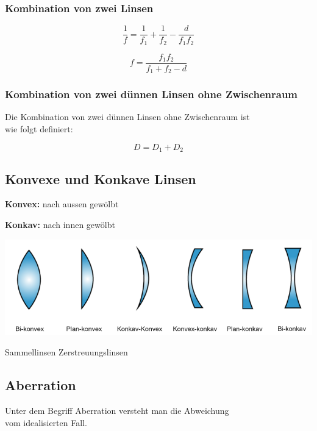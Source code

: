 \subsubsection{Kombination von zwei Linsen}

\begin{minipage}{0.48\linewidth}
	$$ \boxed{\frac{1}{f} = \frac{1}{f_1} + \frac{1}{f_2} - \frac{d}{f_1f_2}} $$
\end{minipage}
\hfill
\begin{minipage}{0.48\linewidth}
	$$ \boxed{f = \frac{f_1f_2}{f_1 + f_2 - d}} $$
\end{minipage}

\subsubsection{Kombination von zwei dünnen Linsen ohne Zwischenraum}

Die Kombination von zwei dünnen Linsen ohne Zwischenraum ist \\
wie folgt definiert:

$$ \boxed{D = D_1 + D_2} $$




\subsection{Konvexe und Konkave Linsen}

\textbf{Konvex:} nach aussen gewölbt

\textbf{Konkav:} nach innen gewölbt

\includegraphics[width=0.9\linewidth]{Bilder/Wellen-Optik/Konvex}

\qquad\qquad Sammellinsen \qquad\qquad\qquad Zerstreuungslinsen



\subsection{Aberration}
Unter dem Begriff Aberration versteht man die Abweichung\\
vom idealisierten Fall. \\

